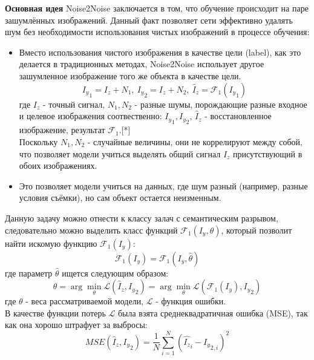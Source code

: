 \par \textbf{Основная идея} Noise2Noise заключается в том, что обучение происходит на паре зашумлённых изображений. Данный факт позволяет сети эффективно удалять шум без необходимости использования чистых изображений в процессе обучения:
\begin{itemize}[]
	\item Вместо использования чистого изображения в качестве цели (label), как это делается в традиционных методах, Noise2Noise использует другое зашумленное изображение того же объекта в качестве цели.
	\begin{equation}
		{I_y}_1 = I_z + N_1,\
		{I_y}_2 = I_z + N_2,\
		\hat I_z = \mathscr{F}_1({I_y}_1)
	\end{equation}
	где $I_z$ - точный сигнал, $N_1, N_2$ - разные шумы, порождающие разные входное и целевое изображения соотвественно: ${I_y}_1, {I_y}_2$, $\hat I_z$ - восстановленное изображение, результат $\mathscr{F}_1$.[*]\\
	Поскольку $N_1, N_2$ - случайные величины, они не коррелируют между собой, что позволяет модели учиться выделять общий сигнал $I_z$ присутствующий в обоих изображениях.
	\item Это позволяет модели учиться на данных, где шум разный (например, разные условия съёмки), но сам объект остается неизменным.
\end{itemize}
\par Данную задачу можно отнести к классу залач с семантическим
разрывом, следовательно можно выделить класс функций $\mathscr{F}_1(I_y, \theta)$, который позволит найти искомую функцию $\mathscr{F}_1(I_y)$:
\begin{equation}
	\mathscr{F}_1(I_y) = \mathscr{F}_1(I_y, \hat \theta)
\end{equation} где параметр $\hat \theta$ ищется следующим образом:
\begin{equation}
	\hat\theta = \arg\min_{\theta}\mathscr{L}(\hat I_z, {I_y}_2) = \arg\min_{\theta}\mathscr{L}(\mathscr{F}_1(I_y), {I_y}_2)
\end{equation}
где $\theta$ - веса рассматриваемой модели, $\mathscr{L}$ - функция ошибки.\\
В качестве функции потерь $\mathscr{L}$ была взята среднеквадратичная ошибка (MSE), так как она хорошо штрафует за выбросы:\\
\begin{equation}
	MSE(\hat I_z, {I_y}_2) = \frac{1}{N}\sum_{i=1}^{N}(\hat {I_z}_i - {I_y}_{2,i})^2
\end{equation}
